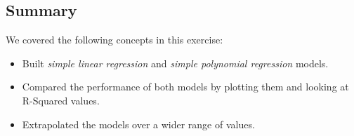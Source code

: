 \documentclass[11pt]{article}
\providecommand{\tightlist}{%
      \setlength{\itemsep}{0pt}\setlength{\parskip}{0pt}}
\begin{document}
\hypertarget{summary}{%
\subsection{Summary}\label{summary}}

We covered the following concepts in this exercise:

\begin{itemize}
\tightlist
\item
  Built \emph{simple linear regression} and \emph{simple polynomial
  regression} models.
\item
  Compared the performance of both models by plotting them and looking
  at R-Squared values.
\item
  Extrapolated the models over a wider range of values.
\end{itemize}


    
    
    
\end{document}
